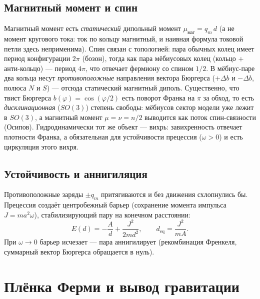 \documentclass[12pt,a4paper]{article}
\begin{document}
\subsection{Магнитный момент и спин}
Магнитный момент есть \emph{статический} дипольный момент $\mu_{\text{маг}}=q_m\,d$
(а не момент кругового тока: ток по кольцу магнитный, и наивная формула
токовой петли здесь неприменима). Спин связан с топологией: пара обычных колец
имеет период конфигурации $2\pi$ (бозон), тогда как пара мёбиусовых колец
(кольцо + анти-кольцо) --- период $4\pi$, что отвечает фермиону со спином $1/2$.
В мёбиус-паре два кольца несут \emph{противоположные} направления вектора
Бюргерса ($+\Delta b$ и $-\Delta b$, полюса $N$ и $S$) --- отсюда статический
магнитный диполь. Существенно, что твист Бюргерса $b(\varphi)=\cos(\varphi/2)$
есть поворот Франка на $\pi$ за обход, то есть \emph{дисклинационная} ($SO(3)$)
степень свободы: мёбиусов сектор модели уже лежит в $SO(3)$, а магнитный момент
$\mu=\nu=n/2$ выводится как поток спин-связности (Осипов). Гидродинамически тот
же объект --- вихрь: завихренность отвечает плотности Франка, а обязательная
для устойчивости прецессия ($\omega>0$) и есть циркуляция этого вихря.

\subsection{Устойчивость и аннигиляция}
Противоположные заряды $\pm q_m$ притягиваются и без движения схлопнулись бы.
Прецессия создаёт центробежный барьер (сохранение момента импульса
$J=m a^2\omega$), стабилизирующий пару на конечном расстоянии:
\begin{equation}
E(d) = -\frac{A}{d} + \frac{J^2}{2 m d^2},\qquad d_{\text{eq}}=\frac{J^2}{mA}.
\end{equation}
При $\omega\to0$ барьер исчезает --- пара аннигилирует (рекомбинация Френкеля,
суммарный вектор Бюргерса обращается в нуль).

\section{Плёнка Ферми и вывод гравитации}
\label{sec:fermi}
\end{document}
